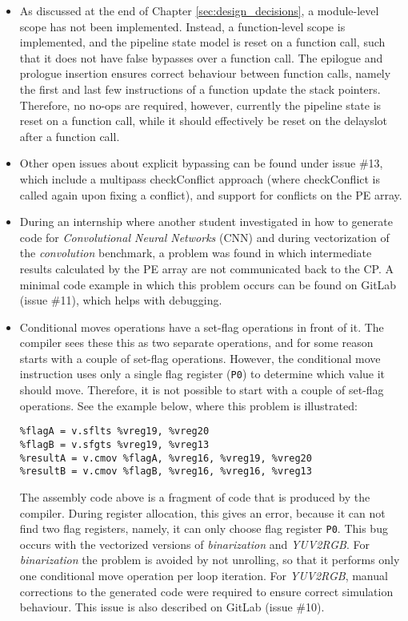 \begin{itemize}
    \item As discussed at the end of Chapter \ref{sec:design_decisions}, a module-level scope has not been implemented. Instead, a function-level scope is implemented, and the pipeline state model is reset on a function call, such that it does not have false bypasses over a function call. The epilogue and prologue insertion ensures correct behaviour between function calls, namely the first and last few instructions of a function update the stack pointers. Therefore, no no-ops are required, however, currently the pipeline state is reset on a function call, while it should effectively be reset on the delayslot after a function call.
    \item Other open issues about explicit bypassing can be found under issue \#13, which include a multipass checkConflict approach (where checkConflict is called again upon fixing a conflict), and support for conflicts on the PE array.
    \item During an internship where another student investigated in how to generate code for \emph{Convolutional Neural Networks} (CNN) \cite{jiachi} and during vectorization of the \emph{convolution} benchmark, a problem was found in which intermediate results calculated by the PE array are not communicated back to the CP. A minimal code example in which this problem occurs can be found on GitLab (issue \#11), which helps with debugging.
    \item Conditional moves operations have a set-flag operations in front of it. The compiler sees these this as two separate operations, and for some reason starts with a couple of set-flag operations. However, the conditional move instruction uses only a single flag register (\texttt{P0}) to determine which value it should move. Therefore, it is not possible to start with a couple of set-flag operations. See the example below, where this problem is illustrated:
\lstset{style=customasm}
\begin{lstlisting}
%flagA = v.sflts %vreg19, %vreg20
%flagB = v.sfgts %vreg19, %vreg13
%resultA = v.cmov %flagA, %vreg16, %vreg19, %vreg20
%resultB = v.cmov %flagB, %vreg16, %vreg16, %vreg13
\end{lstlisting}
The assembly code above is a fragment of code that is produced by the compiler. During register allocation, this gives an error, because it can not find two flag registers, namely, it can only choose flag register \texttt{P0}. This bug occurs with the vectorized versions of \emph{binarization} and \emph{YUV2RGB}. For \emph{binarization} the problem is avoided by not unrolling, so that it performs only one conditional move operation per loop iteration. For \emph{YUV2RGB}, manual corrections to the generated code were required to ensure correct simulation behaviour. This issue is also described on GitLab (issue \#10).
\end{itemize}

